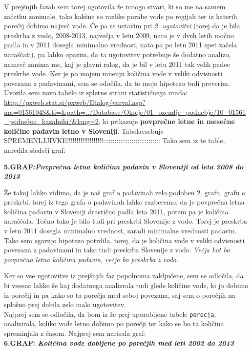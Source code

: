 \documentclass[11pt,a4paper]{article}
\begin{document}
V prejšnjih fazah sem torej ugotovila že mnogo stvari, ki so me na samem začetku zanimale, tako kakšne so razlike porabe vode po regijah ter iz katerih porečij dobimo največ vode. Če pa se ustavim pri \emph{2. ugotovitvi} (torej da je bila preskrba z vodo, 2008-2013, največja v letu 2009, nato je v dveh letih močno padla in v 2011 dosegla minimalno vrednost, nato pa po letu 2011 spet začela naraščati), pa lahko opazim, da ta ugotovitev potrebuje še dodatno analizo, namreč zanima me, kaj je glavni ralog, da je bil v letu 2011 tak velik padec preskrbe vode. Ker je po mojem mnenju količina vode v veliki odvisnosti povezana z padavinami, sem se odočila, da to mojo hipotezo tudi preverim. Uvozila sem novo tabelo iz spletne strani statističnega urada: \url{http://pxweb.stat.si/pxweb/Dialog/varval.asp?ma=0156104S&ti=&path=../Database/Okolje/01_ozemlje_podnebje/10_01561_podnebni_kazalniki/&lang=2}, ki prikazuje \textbf{povprečne letne in mesečne količine padavin letno v Sloveniji}. Tabelavsebuje SPREMENLJJIVKE!!!!!!!!!!!!!!!!!!!:::::::::::::::::::::::::::::: Tako sem iz te table, naredila sledeči graf:
\newpage

\textbf{5.GRAF:\emph{Povprečna letna količina padavin v Sloveniji od leta 2008 do 2013}}


Že takoj lahko vidimo, da je naš graf o padavinah zelo podoben 2. grafu, grafu o preskrbi, torej iz tega grafa o padavinah lahko razberemo, da je povprečna letna količina padavin v Sloveniji drastično padla leta 2011, potem pa je količina naraščala. Točno tako je bilo tudi pri preskrbi Slovenije z vodo. Torej je preskrba v letu 2011 dosegla minimalno vrednost, zaradi minimalne vrednosti padavin.  Tako sem zgornjo hipotezo potrdila, torej, da je količina vode v veliki odvisnosti povezana z padavinami in tako tudi preskrba Slovenije z vodo. \emph{Večja kot bo povprečna letna količina padavin, večja bo preskrba z vodo}.

\newpage

Ker so vse ugotovitve iz prejšnjih faz popolnoma zaključene, sem se odločila, da bi vseeno lahko še kaj dodatnega analizrala tudi glede količine vode, ki jo dobimo iz porečij in pa kako so ta porečja med seboj povezana, saj sem o porečjih na splošno prej dobila zelo malo ugotovitev.\\

Najprej sem se odločila, da bom iz že prej uporabljene tabele \verb|porecja|, analizirala, koliko vode letno dobimo po porečji ter kako se bo ta količina spreminjala z časom. Najprej sem narisala graf:\\
\textbf{6.GRAF: \emph{Količina vode dobljene po porečjih med leti 2002 do 2013}}
\end{document}
